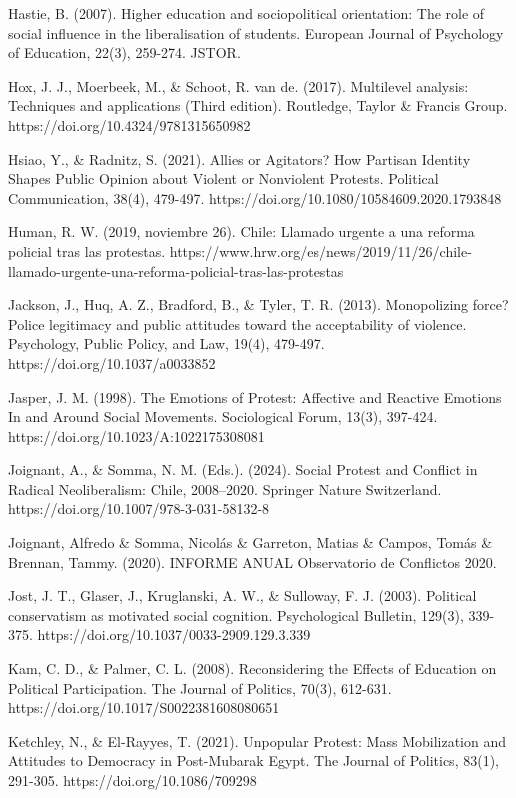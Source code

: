 \documentclass[
  13pt,
]{article}
\begin{document}
Hastie, B. (2007). Higher education and sociopolitical orientation: The
role of social influence in the liberalisation of students. European
Journal of Psychology of Education, 22(3), 259-274. JSTOR.

Hox, J. J., Moerbeek, M., \& Schoot, R. van de. (2017). Multilevel
analysis: Techniques and applications (Third edition). Routledge, Taylor
\& Francis Group. https://doi.org/10.4324/9781315650982

Hsiao, Y., \& Radnitz, S. (2021). Allies or Agitators? How Partisan
Identity Shapes Public Opinion about Violent or Nonviolent Protests.
Political Communication, 38(4), 479-497.
https://doi.org/10.1080/10584609.2020.1793848

Human, R. W. (2019, noviembre 26). Chile: Llamado urgente a una reforma
policial tras las protestas.
https://www.hrw.org/es/news/2019/11/26/chile-llamado-urgente-una-reforma-policial-tras-las-protestas

Jackson, J., Huq, A. Z., Bradford, B., \& Tyler, T. R. (2013).
Monopolizing force? Police legitimacy and public attitudes toward the
acceptability of violence. Psychology, Public Policy, and Law, 19(4),
479-497. https://doi.org/10.1037/a0033852

Jasper, J. M. (1998). The Emotions of Protest: Affective and Reactive
Emotions In and Around Social Movements. Sociological Forum, 13(3),
397-424. https://doi.org/10.1023/A:1022175308081

Joignant, A., \& Somma, N. M. (Eds.). (2024). Social Protest and
Conflict in Radical Neoliberalism: Chile, 2008--2020. Springer Nature
Switzerland. https://doi.org/10.1007/978-3-031-58132-8

Joignant, Alfredo \& Somma, Nicolás \& Garreton, Matias \& Campos, Tomás
\& Brennan, Tammy. (2020). INFORME ANUAL Observatorio de Conflictos
2020.

Jost, J. T., Glaser, J., Kruglanski, A. W., \& Sulloway, F. J. (2003).
Political conservatism as motivated social cognition. Psychological
Bulletin, 129(3), 339-375. https://doi.org/10.1037/0033-2909.129.3.339

Kam, C. D., \& Palmer, C. L. (2008). Reconsidering the Effects of
Education on Political Participation. The Journal of Politics, 70(3),
612-631. https://doi.org/10.1017/S0022381608080651

Ketchley, N., \& El-Rayyes, T. (2021). Unpopular Protest: Mass
Mobilization and Attitudes to Democracy in Post-Mubarak Egypt. The
Journal of Politics, 83(1), 291-305. https://doi.org/10.1086/709298
\end{document}
